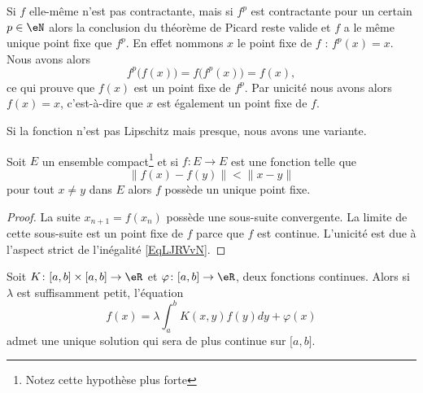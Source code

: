 \begin{remark}  \label{remIOHUJm}
    Si \( f\) elle-même n'est pas contractante, mais si \( f^p\) est contractante pour un certain \( p\in \eN\) alors la conclusion du théorème de Picard reste valide et \( f\) a le même unique point fixe que \( f^p\). En effet nommons \( x\) le point fixe de \( f\) : \( f^p(x)=x\). Nous avons alors
    \begin{equation}
        f^p\big( f(x) \big)=f\big( f^p(x) \big)=f(x),
    \end{equation}
    ce qui prouve que \( f(x)\) est un point fixe de \( f^p\). Par unicité nous avons alors \( f(x)=x\), c'est-à-dire que \( x\) est également un point fixe de \( f\).
\end{remark}

Si la fonction n'est pas Lipschitz mais presque, nous avons une variante.
\begin{proposition}
    Soit \( E\) un ensemble compact\footnote{Notez cette hypothèse plus forte} et si \( f\colon E\to E\) est une fonction telle que
    \begin{equation}        \label{EqLJRVvN}
        \| f(x)-f(y) \|< \| x-y \|
    \end{equation}
    pour tout \( x\neq y\) dans \( E\) alors \( f\) possède un unique point fixe.
\end{proposition}

\begin{proof}
    La suite \( x_{n+1}=f(x_n)\) possède une sous-suite convergente. La limite de cette sous-suite est un point fixe de \( f\) parce que \( f\) est continue. L'unicité est due à l'aspect strict de l'inégalité \eqref{EqLJRVvN}.
\end{proof}

\begin{theorem}     \label{ThoagJPZJ}
    Soit \( K\colon \mathopen[ a , b \mathclose]\times \mathopen[ a , b \mathclose]\to \eR\) et \( \varphi\colon \mathopen[ a , b \mathclose]\to \eR\), deux fonctions continues. Alors si \( \lambda\) est suffisamment petit, l'équation
    \begin{equation}
        f(x)=\lambda\int_a^bK(x,y)f(y)dy+\varphi(x)
    \end{equation}
    admet une unique solution qui sera de plus continue sur \( \mathopen[ a , b \mathclose]\).
\end{theorem}

